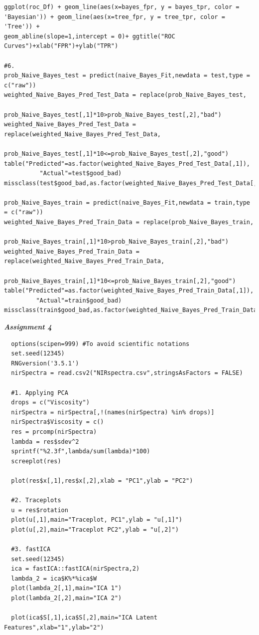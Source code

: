 \documentclass[a4paper,10pt]{article}
\begin{document}
\begin{lstlisting}
ggplot(roc_Df) + geom_line(aes(x=bayes_fpr, y = bayes_tpr, color = 'Bayesian')) + geom_line(aes(x=tree_fpr, y = tree_tpr, color = 'Tree')) +
geom_abline(slope=1,intercept = 0)+ ggtitle("ROC Curves")+xlab("FPR")+ylab("TPR")

#6.
prob_Naive_Bayes_test = predict(naive_Bayes_Fit,newdata = test,type = c("raw"))
weighted_Naive_Bayes_Pred_Test_Data = replace(prob_Naive_Bayes_test,
          prob_Naive_Bayes_test[,1]*10>prob_Naive_Bayes_test[,2],"bad")
weighted_Naive_Bayes_Pred_Test_Data = replace(weighted_Naive_Bayes_Pred_Test_Data,
          prob_Naive_Bayes_test[,1]*10<=prob_Naive_Bayes_test[,2],"good")
table("Predicted"=as.factor(weighted_Naive_Bayes_Pred_Test_Data[,1]),
          "Actual"=test$good_bad)
missclass(test$good_bad,as.factor(weighted_Naive_Bayes_Pred_Test_Data[,1]))

prob_Naive_Bayes_train = predict(naive_Bayes_Fit,newdata = train,type = c("raw"))
weighted_Naive_Bayes_Pred_Train_Data = replace(prob_Naive_Bayes_train,
          prob_Naive_Bayes_train[,1]*10>prob_Naive_Bayes_train[,2],"bad")
weighted_Naive_Bayes_Pred_Train_Data = replace(weighted_Naive_Bayes_Pred_Train_Data,
          prob_Naive_Bayes_train[,1]*10<=prob_Naive_Bayes_train[,2],"good")
table("Predicted"=as.factor(weighted_Naive_Bayes_Pred_Train_Data[,1]),
         "Actual"=train$good_bad)
missclass(train$good_bad,as.factor(weighted_Naive_Bayes_Pred_Train_Data[,1]))
\end{lstlisting}
\par
\vspace{0.5cm}
\large \textit{\textbf{Assignment 4}} \par
\begin{lstlisting}
  options(scipen=999) #To avoid scientific notations
  set.seed(12345)
  RNGversion('3.5.1')
  nirSpectra = read.csv2("NIRspectra.csv",stringsAsFactors = FALSE)
  
  #1. Applying PCA
  drops = c("Viscosity")
  nirSpectra = nirSpectra[,!(names(nirSpectra) %in% drops)]
  nirSpectra$Viscosity = c()
  res = prcomp(nirSpectra)
  lambda = res$sdev^2
  sprintf("%2.3f",lambda/sum(lambda)*100)
  screeplot(res)
  
  plot(res$x[,1],res$x[,2],xlab = "PC1",ylab = "PC2")
  
  #2. Traceplots
  u = res$rotation
  plot(u[,1],main="Traceplot, PC1",ylab = "u[,1]")
  plot(u[,2],main="Traceplot PC2",ylab = "u[,2]")
  
  #3. fastICA
  set.seed(12345)
  ica = fastICA::fastICA(nirSpectra,2)
  lambda_2 = ica$K%*%ica$W
  plot(lambda_2[,1],main="ICA 1")
  plot(lambda_2[,2],main="ICA 2")
  
  plot(ica$S[,1],ica$S[,2],main="ICA Latent Features",xlab="1",ylab="2")  
\end{lstlisting}
\end{document}
